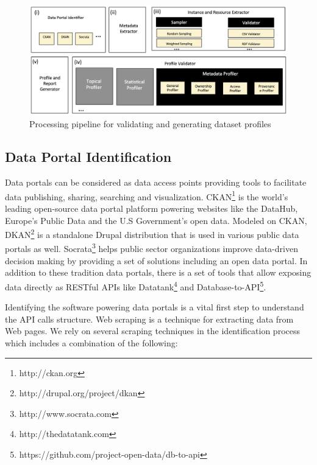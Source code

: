 \documentclass[runningheads,a4paper]{llncs}
\begin{document}
\begin{figure}[!ht]
  \centering
    \includegraphics[scale=0.4]{figure-1_architecture.png}
  \caption{Processing pipeline for validating and generating dataset profiles}
  \label{fig:1}
\end{figure}

\subsection{Data Portal Identification}

Data portals can be considered as data access points providing tools to facilitate data publishing, sharing, searching and visualization. CKAN\footnote{http://ckan.org} is the world's leading open-source data portal platform powering websites like the DataHub, Europe's Public Data and the U.S Government's open data. Modeled on CKAN, DKAN\footnote{http://drupal.org/project/dkan} is a standalone Drupal distribution that is used in various public data portals as well. Socrata\footnote{http://www.socrata.com} helps public sector organizations improve data-driven decision making by providing a set of solutions including an open data portal. In addition to these tradition data portals, there is a set of tools that allow exposing data directly as RESTful APIs like Datatank\footnote{http://thedatatank.com} and Database-to-API\footnote{https://github.com/project-open-data/db-to-api}.

Identifying the software powering data portals is a vital first step to understand the API calls structure. Web scraping is a technique for extracting data from Web pages. We rely on several scraping techniques in the identification process which includes a combination of the following:
\end{document}
